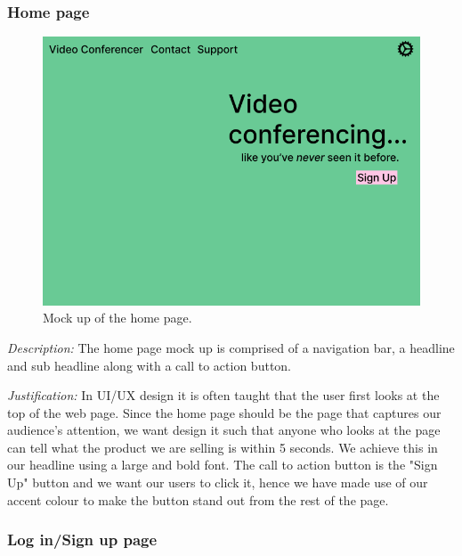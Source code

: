 \subsubsection{Home page}

\begin{figure}[H]
\centering

\includegraphics[scale=0.2]{Images/HomeUI_1.png}

\caption{Mock up of the home page.}
\label{fig:ui1}
\end{figure}

\textit{Description:}
The home page mock up is comprised of a navigation bar, a 
headline and sub headline along with a call to action button.
\\ \vspace{0.2cm}

\textit{Justification:}
In UI/UX design it is often taught that the user first looks 
at the top of the web page. Since the home page should be the 
page that captures our audience's attention, we want design 
it such that anyone who looks at the page can tell what the 
product we are selling is within 5 seconds. We achieve this 
in our headline using a large and bold font. The call to
action button is the "Sign Up" button and we want our users 
to click it, hence we have made use of our accent colour to 
make the button stand out from the rest of the page.\\

\subsubsection{Log in/Sign up page}

